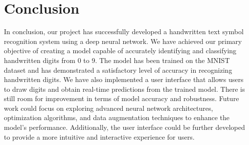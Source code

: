 \documentclass{article}
\begin{document}
\section{Conclusion}
In conclusion, our project has successfully developed a handwritten text symbol recognition system using a deep neural network. We have achieved our primary objective of creating a model capable of accurately identifying and classifying handwritten digits from 0 to 9. The model has been trained on the MNIST dataset and has demonstrated a satisfactory level of accuracy in recognizing handwritten digits. We have also implemented a user interface that allows users to draw digits and obtain real-time predictions from the trained model.
There is still room for improvement in terms of model accuracy and robustness. Future work could focus on exploring advanced neural network architectures, optimization algorithms, and data augmentation techniques to enhance the model's performance. Additionally, the user interface could be further developed to provide a more intuitive and interactive experience for users.

\newpage
\printbibliography 
\end{document}
